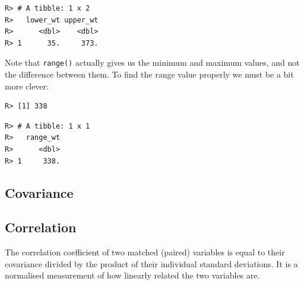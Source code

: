 \documentclass[english,10pt,a4paper,oneside]{book}
\newenvironment{Shaded}{\begin{snugshade}}{\end{snugshade}}
\newcommand{\DataTypeTok}[1]{\textcolor[rgb]{0.13,0.29,0.53}{#1}}
\newcommand{\DecValTok}[1]{\textcolor[rgb]{0.00,0.00,0.81}{#1}}
\newcommand{\KeywordTok}[1]{\textcolor[rgb]{0.13,0.29,0.53}{\textbf{#1}}}
\newcommand{\NormalTok}[1]{#1}
\newcommand{\OperatorTok}[1]{\textcolor[rgb]{0.81,0.36,0.00}{\textbf{#1}}}
\newcommand{\StringTok}[1]{\textcolor[rgb]{0.31,0.60,0.02}{#1}}
\theoremstyle{definition}
\theoremstyle{definition}
\theoremstyle{definition}
\theoremstyle{remark}
\begin{document}
\begin{verbatim}
R> # A tibble: 1 x 2
R>   lower_wt upper_wt
R>      <dbl>    <dbl>
R> 1      35.     373.
\end{verbatim}

Note that \texttt{range()} actually gives us the minimum and maximum
values, and not the difference between them. To find the range value
properly we must be a bit more clever:

\begin{Shaded}
\end{Shaded}

\begin{verbatim}
R> [1] 338
\end{verbatim}

\begin{Shaded}
\end{Shaded}

\begin{verbatim}
R> # A tibble: 1 x 1
R>   range_wt
R>      <dbl>
R> 1     338.
\end{verbatim}

\hypertarget{covariance}{%
\subsection{Covariance}\label{covariance}}

\hypertarget{correlation}{%
\subsection{Correlation}\label{correlation}}

The correlation coefficient of two matched (paired) variables is equal
to their covariance divided by the product of their individual standard
deviations. It is a normalised measurement of how linearly related the
two variables are.
\end{document}
